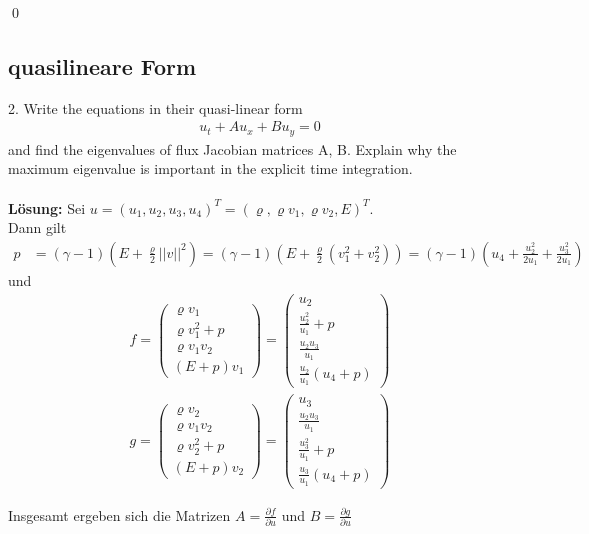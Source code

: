 \documentclass[11pt]{scrartcl}
\begin{document}
\qed
\newline
\noindent 
\subsection{quasilineare Form}

2. Write the equations in their quasi-linear form
\begin{align*}
	u_t+Au_x + Bu_y =0 
\end{align*}
and find the eigenvalues of flux Jacobian matrices A, B. Explain why
the maximum eigenvalue is important in the explicit time integration.
\\
\\
\textbf{Lösung:}
Sei $u=(u_1,u_2,u_3,u_4)^T=(\varrho , \varrho v_1, \varrho v_2, E)^T$. \\
Dann gilt 
\begin{align*}
	p&=(\gamma -1)(E+\frac{\varrho}{2} ||v||^2)
	=(\gamma -1)(E+\frac{\varrho}{2} (v_1^2+v_2^2))
	=(\gamma -1)(u_4+ \frac{u_2^2}{2 u_1}+\frac{u_3^2}{2 u_1} )
\end{align*}
und 
\begin{align*}
	f=\left(\begin{array}{c} \varrho v_1 \\ \varrho v_1^2 + p \\ \varrho v_1 v_2 \\ (E+p)v_1 \end{array}\right)= \left(\begin{array}{c} u_2 \\ \frac{u_2^2}{u_1} + p \\ \frac{u_2 u_3}{u_1} \\ \frac{u_2}{u_1} (u_4+p) \end{array}\right)\\
	g=\left(\begin{array}{c} \varrho v_2 \\ \varrho v_1 v_2 \\ \varrho v_2^2+p \\ (E+p)v_2 \end{array}\right)=
	\left(\begin{array}{c} u_3 \\ \frac{u_2 u_3}{u_1} \\ \frac{u_3^2}{u_1} + p \\ \frac{u_3}{u_1} (u_4+p) \end{array}\right)
\end{align*}

Insgesamt ergeben sich die Matrizen $A=\frac{\partial f}{\partial u}$ und $B=\frac{\partial g}{\partial u}$
\end{document}
